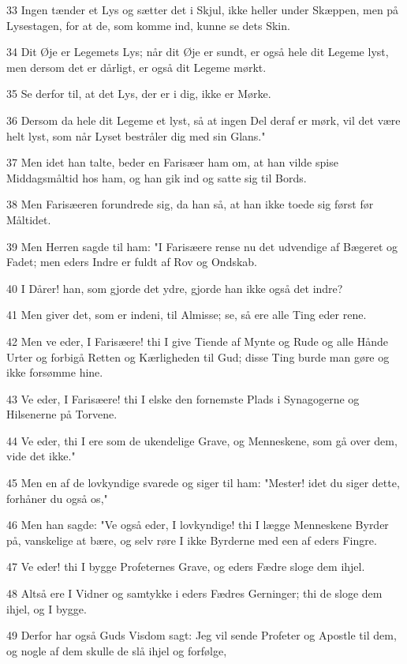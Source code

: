 \par 33 Ingen tænder et Lys og sætter det i Skjul, ikke heller under Skæppen, men på Lysestagen, for at de, som komme ind, kunne se dets Skin.
\par 34 Dit Øje er Legemets Lys; når dit Øje er sundt, er også hele dit Legeme lyst, men dersom det er dårligt, er også dit Legeme mørkt.
\par 35 Se derfor til, at det Lys, der er i dig, ikke er Mørke.
\par 36 Dersom da hele dit Legeme et lyst, så at ingen Del deraf er mørk, vil det være helt lyst, som når Lyset bestråler dig med sin Glans."
\par 37 Men idet han talte, beder en Farisæer ham om, at han vilde spise Middagsmåltid hos ham, og han gik ind og satte sig til Bords.
\par 38 Men Farisæeren forundrede sig, da han så, at han ikke toede sig først før Måltidet.
\par 39 Men Herren sagde til ham: "I Farisæere rense nu det udvendige af Bægeret og Fadet; men eders Indre er fuldt af Rov og Ondskab.
\par 40 I Dårer! han, som gjorde det ydre, gjorde han ikke også det indre?
\par 41 Men giver det, som er indeni, til Almisse; se, så ere alle Ting eder rene.
\par 42 Men ve eder, I Farisæere! thi I give Tiende af Mynte og Rude og alle Hånde Urter og forbigå Retten og Kærligheden til Gud; disse Ting burde man gøre og ikke forsømme hine.
\par 43 Ve eder, I Farisæere! thi I elske den fornemste Plads i Synagogerne og Hilsenerne på Torvene.
\par 44 Ve eder, thi I ere som de ukendelige Grave, og Menneskene, som gå over dem, vide det ikke."
\par 45 Men en af de lovkyndige svarede og siger til ham: "Mester! idet du siger dette, forhåner du også os,"
\par 46 Men han sagde: "Ve også eder, I lovkyndige! thi I lægge Menneskene Byrder på, vanskelige at bære, og selv røre I ikke Byrderne med een af eders Fingre.
\par 47 Ve eder! thi I bygge Profeternes Grave, og eders Fædre sloge dem ihjel.
\par 48 Altså ere I Vidner og samtykke i eders Fædres Gerninger; thi de sloge dem ihjel, og I bygge.
\par 49 Derfor har også Guds Visdom sagt: Jeg vil sende Profeter og Apostle til dem, og nogle af dem skulle de slå ihjel og forfølge,
